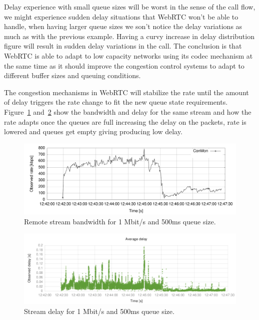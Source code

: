 Delay experience with small queue sizes will be worst in the sense of the call flow, we might experience sudden delay situations that WebRTC won't be able to handle, when having larger queue sizes we son't notice the delay variations as much as with the previous example. Having a curvy increase in delay distribution figure will result in sudden delay variations in the call. The conclusion is that WebRTC is able to adapt to low capacity networks using its codec mechanism at the same time as it should improve the congestion control systems to adapt to different buffer sizes and queuing conditions. 

The congestion mechanisms in WebRTC will stabilize the rate until the amount of delay triggers the rate change to fit the new queue state requirements. Figure~\ref{fig:1cd81aa8-bw} and~\ref{fig:1cd81aa8-delay} show the bandwidth and delay for the same stream and how the rate adapts once the queues are full increasing the delay on the packets, rate is lowered and queues get empty giving producing low delay.

 \begin{figure}[h]
  \centering
    \includegraphics[width=1\textwidth]{./figures/1cd81aa8-bw.pdf}
      \caption[Remote stream bandwidth for 1 Mbit/s and 500ms queue size]{Remote stream bandwidth for 1 Mbit/s and 500ms queue size.}
	\label{fig:1cd81aa8-bw}
\end{figure}

 \begin{figure}[h]
  \centering
    \includegraphics[width=1\textwidth]{./figures/1cd81aa8-delay.pdf}
      \caption[Stream delay for 1 Mbit/s and 500ms queue size]{Stream delay for 1 Mbit/s and 500ms queue size.}
	\label{fig:1cd81aa8-delay}
\end{figure}

